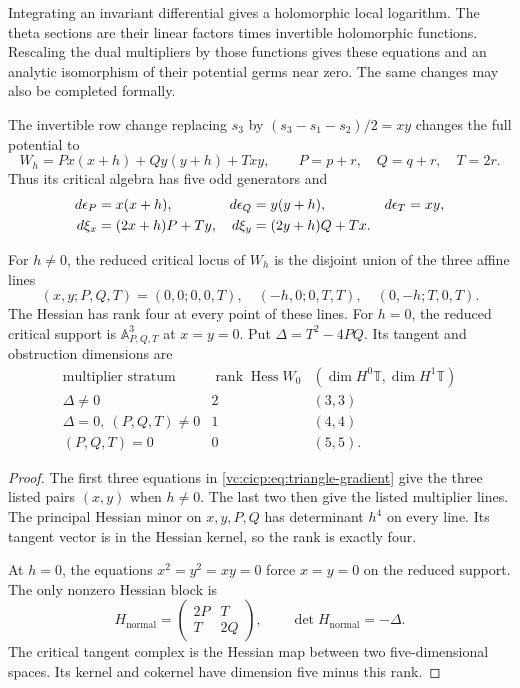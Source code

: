 Integrating an invariant differential gives a holomorphic
local logarithm. The theta sections are their linear factors
times invertible holomorphic functions. Rescaling the dual
multipliers by those functions gives these equations and an
analytic isomorphism of their potential germs near zero.
The same changes may also be completed formally.

The invertible row change replacing $s_3$ by
$(s_3-s_1-s_2)/2=xy$ changes the full potential to
\begin{equation}\label{vc:cicp:eq:triangle-potential}
 W_h=P x(x+h)+Q y(y+h)+Txy,
 \qquad P=p+r,\quad Q=q+r,\quad T=2r.
\end{equation}
Thus its critical algebra has five odd generators and
\begin{align}
 d\epsilon_P&=x(x+h),& d\epsilon_Q&=y(y+h),&
 d\epsilon_T&=xy,\notag\\
 d\xi_x&=(2x+h)P+Ty,&
 d\xi_y&=(2y+h)Q+Tx.
 \label{vc:cicp:eq:triangle-gradient}
\end{align}

\begin{proposition}\label{vc:cicp:prop:triangle-strata}
For $h\ne0$, the reduced critical locus of $W_h$ is the
disjoint union of the three affine lines
\[
 (x,y;P,Q,T)=(0,0;0,0,T),\quad
 (-h,0;0,T,T),\quad (0,-h;T,0,T).
\]
The Hessian has rank four at every point of these lines.
For $h=0$, the reduced critical support is
$\mathbb A^3_{P,Q,T}$ at $x=y=0$.
Put $\Delta=T^2-4PQ$. Its tangent and obstruction dimensions are
\[
\begin{array}{c|c|c}
 \text{multiplier stratum}&\operatorname{rank}\operatorname{Hess}W_0
       &(\dim H^0\mathbb T,\dim H^1\mathbb T)\\\hline
 \Delta\ne0&2&(3,3)\\
 \Delta=0,\ (P,Q,T)\ne0&1&(4,4)\\
 (P,Q,T)=0&0&(5,5).
\end{array}
\]
\end{proposition}

\begin{proof}
The first three equations in \eqref{vc:cicp:eq:triangle-gradient}
give the three listed pairs $(x,y)$ when $h\ne0$.
The last two then give the listed multiplier lines.
The principal Hessian minor on $x,y,P,Q$ has determinant
$h^4$ on every line. Its tangent vector is in the Hessian
kernel, so the rank is exactly four.

At $h=0$, the equations $x^2=y^2=xy=0$ force $x=y=0$
on the reduced support. The only nonzero Hessian block is
\begin{equation}\label{vc:cicp:eq:normal-hessian}
 H_{\mathrm{normal}}=
 \begin{pmatrix}2P&T\\T&2Q\end{pmatrix},
 \qquad \det H_{\mathrm{normal}}=-\Delta.
\end{equation}
The critical tangent complex is the Hessian map between
two five-dimensional spaces. Its kernel and cokernel have
dimension five minus this rank.
\end{proof}

